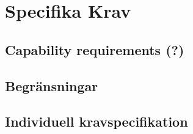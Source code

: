 \section{Specifika Krav}

\subsection{Capability requirements (?)}

\subsection{Begränsningar}

\subsection{Individuell kravspecifikation}